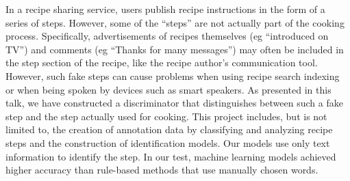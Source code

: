 In a recipe sharing service, users publish recipe instructions in the form of a series of steps. However, some of the ``steps'' are not actually part of the cooking process. Specifically, advertisements of recipes themselves (eg ``introduced on TV'') and comments (eg ``Thanks for many messages'') may often be included in the step section of the recipe, like the recipe author's communication tool. However, such fake steps can cause problems when using recipe search indexing or when being spoken by devices such as smart speakers. As presented in this talk, we have constructed a discriminator that distinguishes between such a fake step and the step actually used for cooking. This project includes, but is not limited to, the creation of annotation data by classifying and analyzing recipe steps and the construction of identification models. Our models use only text information to identify the step. In our test, machine learning models achieved higher accuracy than rule-based methods that use manually chosen words.
